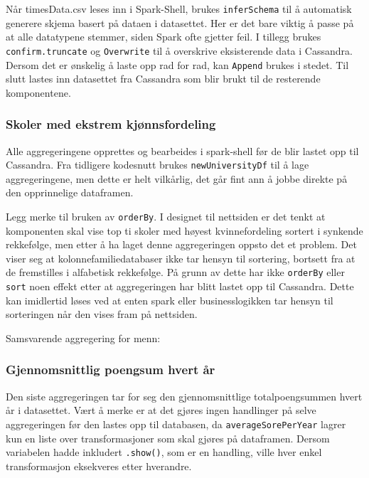 
Når timesData.csv leses inn i Spark-Shell, brukes \lstinline{inferSchema} til å automatisk generere skjema basert på dataen i datasettet. Her er det bare viktig å passe på at alle datatypene stemmer, siden Spark ofte gjetter feil. I tillegg brukes \lstinline{confirm.truncate} og \lstinline{Overwrite} til å overskrive eksisterende data i Cassandra. Dersom det er ønskelig å laste opp rad for rad, kan \lstinline{Append} brukes i stedet. Til slutt lastes inn datasettet fra Cassandra som blir brukt til de resterende komponentene.

\subsubsection{Skoler med ekstrem kjønnsfordeling}
Alle aggregeringene opprettes og bearbeides i spark-shell før de blir lastet opp til Cassandra. Fra tidligere kodesnutt brukes \lstinline{newUniversityDf} til å lage aggregeringene, men dette er helt vilkårlig, det går fint ann å jobbe direkte på den opprinnelige dataframen.

Legg merke til bruken av \lstinline{orderBy}. I designet til nettsiden er det tenkt at komponenten skal vise top ti skoler med høyest kvinnefordeling sortert i synkende rekkefølge, men etter å ha laget denne aggregeringen oppsto det et problem. Det viser seg at kolonnefamiliedatabaser ikke tar hensyn til sortering, bortsett fra at de fremstilles i alfabetisk rekkefølge. På grunn av dette har ikke \lstinline{orderBy} eller \lstinline{sort} noen effekt etter at aggregeringen har blitt lastet opp til Cassandra. Dette kan imidlertid løses ved at enten spark eller businesslogikken tar hensyn til sorteringen når den vises fram på nettsiden.


Samsvarende aggregering for menn:


\subsubsection{Gjennomsnittlig poengsum hvert år}
Den siste aggregeringen tar for seg den gjennomsnittlige totalpoengsummen hvert år i datasettet. Vært å merke er at det gjøres ingen handlinger på selve aggregeringen før den lastes opp til databasen, da \lstinline{averageSorePerYear} lagrer kun en liste over transformasjoner som skal gjøres på dataframen. Dersom variabelen hadde inkludert \lstinline{.show()}, som er en handling, ville hver enkel transformasjon eksekveres etter hverandre.

